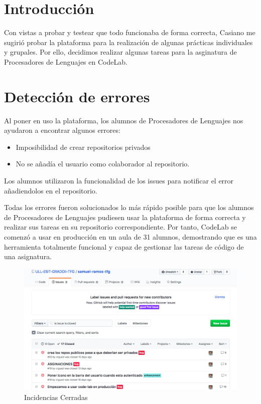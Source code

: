 
\section{Introducción}
\label{4:sec1}

Con vistas a probar y testear que todo funcionaba de forma correcta, Casiano me sugirió probar la plataforma para la realización de algunas prácticas individuales y grupales.
Por ello, decidimos realizar algunas tareas para la asginatura de Procesadores de Lenguajes en CodeLab.

\section{Detección de errores}
\label{4:sec2}

Al poner en uso la plataforma, los alumnos de Procesadores de Lenguajes nos ayudaron a encontrar algunos errores:

\begin{itemize}
    \item Imposibilidad de crear repositorios privados
    \item No se añadía el usuario como colaborador al repositorio.
\end{itemize}

Los alumnos utilizaron la funcionalidad de los issues para notificar el error añadiendolos en el repositorio.

Todas los errores fueron solucionados lo más rápido posible para que los alumnos de Procesadores de Lenguajes pudiesen usar la plataforma de forma correcta y realizar sus tareas en su repositorio correspondiente.
Por tanto, CodeLab se comenzó a usar en producción en un aula de 31 alumnos, demostrando que es una herramienta totalmente funcional y capaz de gestionar las tareas de código de una asignatura.

\begin{figure}[!th]
\begin{center}
\includegraphics[scale=0.5]{images/issues}
\caption{Incidencias Cerradas }
\label{fig:issues}
\end{center}
\end{figure}

